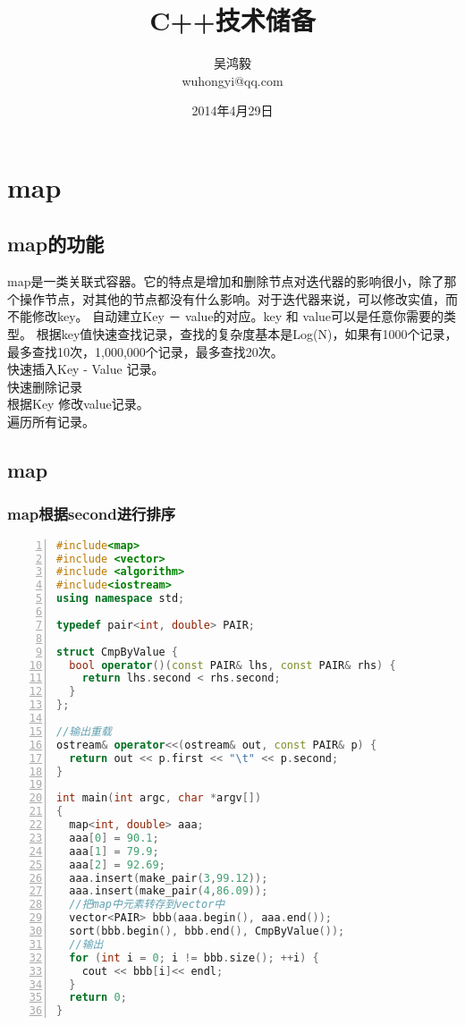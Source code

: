 \documentclass[11pt,a4paper,titlepage]{article}
\title{\Huge\kai C++技术储备}
\author{\ming 吴鸿毅\\
            wuhongyi@qq.com}
\date{\ming 2014年4月29日}
\begin{document}
\maketitle%
\tableofcontents%
\newpage%

\section{\kai map}
\subsection{\kai map的功能}
\ming map是一类关联式容器。它的特点是增加和删除节点对迭代器的影响很小，除了那个操作节点，对其他的节点都没有什么影响。对于迭代器来说，可以修改实值，而不能修改key。
自动建立Key － value的对应。key 和 value可以是任意你需要的类型。
根据key值快速查找记录，查找的复杂度基本是Log(N)，如果有1000个记录，最多查找10次，1,000,000个记录，最多查找20次。\\
快速插入Key - Value 记录。\\
快速删除记录\\
根据Key 修改value记录。\\
遍历所有记录。\\
\subsection{\kai map}
\subsubsection{\kai map根据second进行排序}
\begin{lstlisting}[language=C++, numbers=left]
#include<map>
#include <vector>
#include <algorithm>
#include<iostream>
using namespace std;

typedef pair<int, double> PAIR;

struct CmpByValue {
  bool operator()(const PAIR& lhs, const PAIR& rhs) {
    return lhs.second < rhs.second;
  }
};

//输出重载
ostream& operator<<(ostream& out, const PAIR& p) {
  return out << p.first << "\t" << p.second;
}

int main(int argc, char *argv[])
{
  map<int, double> aaa;
  aaa[0] = 90.1;
  aaa[1] = 79.9;
  aaa[2] = 92.69;
  aaa.insert(make_pair(3,99.12));
  aaa.insert(make_pair(4,86.09));
  //把map中元素转存到vector中 
  vector<PAIR> bbb(aaa.begin(), aaa.end());
  sort(bbb.begin(), bbb.end(), CmpByValue());
  //输出
  for (int i = 0; i != bbb.size(); ++i) {
    cout << bbb[i]<< endl;
  }
  return 0;
}
\end{lstlisting}
\end{document}
